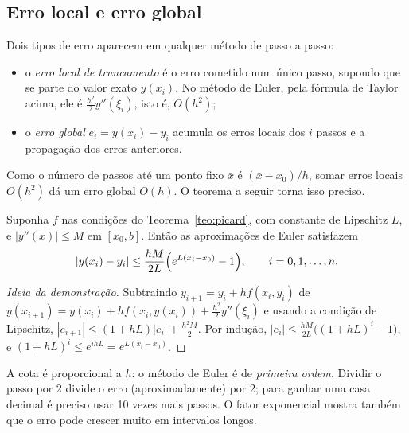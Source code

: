 \subsection{Erro local e erro global}

Dois tipos de erro aparecem em qualquer método de passo a passo:
\begin{itemize}[nosep]
  \item o \emph{erro local de truncamento} é o erro cometido num único passo, supondo que se
        parte do valor exato $y(x_i)$. No método de Euler, pela fórmula de Taylor acima, ele é
        $\frac{h^2}{2}y''(\xi_i)$, isto é, $O(h^2)$;
  \item o \emph{erro global} $e_i=y(x_i)-y_i$ acumula os erros locais dos $i$ passos e a
        propagação dos erros anteriores.
\end{itemize}
Como o número de passos até um ponto fixo $\bar x$ é $(\bar x-x_0)/h$, somar erros locais
$O(h^2)$ dá um erro global $O(h)$. O teorema a seguir torna isso preciso.

\begin{teorema}\label{teo:erroeuler}
Suponha $f$ nas condições do Teorema~\ref{teo:picard}, com constante de Lipschitz $L$, e
$|y''(x)|\le M$ em $[x_0,b]$. Então as aproximações de Euler satisfazem
\[
|y(x_i)-y_i|\le\frac{hM}{2L}\Bigl(e^{L(x_i-x_0)}-1\Bigr),\qquad i=0,1,\dots,n.
\]
\end{teorema}

\begin{proof}[Ideia da demonstração]
Subtraindo $y_{i+1}=y_i+hf(x_i,y_i)$ de
$y(x_{i+1})=y(x_i)+hf(x_i,y(x_i))+\frac{h^2}{2}y''(\xi_i)$ e usando a condição de
Lipschitz, $|e_{i+1}|\le(1+hL)|e_i|+\frac{h^2M}{2}$. Por indução,
$|e_i|\le\frac{hM}{2L}\bigl((1+hL)^i-1\bigr)$, e $(1+hL)^i\le e^{ihL}=e^{L(x_i-x_0)}$.
\end{proof}

A cota é proporcional a $h$: o método de Euler é de \emph{primeira ordem}. Dividir o passo por
2 divide o erro (aproximadamente) por 2; para ganhar uma casa decimal é preciso usar 10 vezes
mais passos. O fator exponencial mostra também que o erro pode crescer muito em intervalos
longos.

